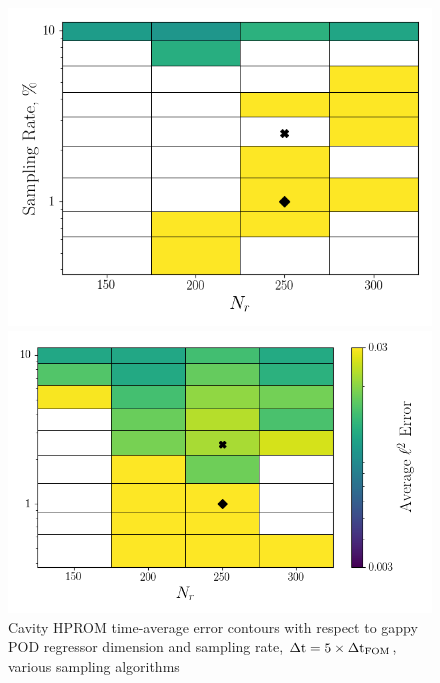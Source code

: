 \begin{figure}
	\begin{minipage}{0.46\linewidth}
		\includegraphics[width=0.99\linewidth]{Chapters/CavityAndCVRC/Images/cavity/deim/err_contour_gnat1_dt5e-6.png}
	\end{minipage}
	\begin{minipage}{0.53\linewidth}
		\includegraphics[width=0.99\linewidth]{Chapters/CavityAndCVRC/Images/cavity/deim/err_contour_gnat2_dt5e-6.png}
	\end{minipage}
	\caption{Cavity HPROM time-average error contours with respect to gappy POD regressor dimension and sampling rate, $\Delta \text{t} = 5 \times \Delta \text{t}_{\text{FOM}}$, various sampling algorithms}
\end{figure}

